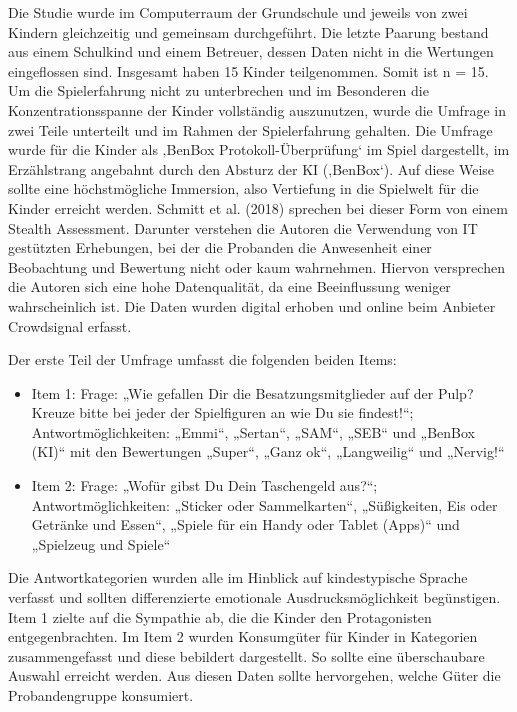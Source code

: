 \documentclass[
  a4paper,
  DIV=11,
  numbers=noendperiod,
  onecolumn,
  oneside,
  a4paper]{scrartcl}
\providecommand{\tightlist}{%
  \setlength{\itemsep}{0pt}\setlength{\parskip}{0pt}}
\begin{document}
Die Studie wurde im Computerraum der Grundschule und jeweils von zwei
Kindern gleichzeitig und gemeinsam durchgeführt. Die letzte Paarung
bestand aus einem Schulkind und einem Betreuer, dessen Daten nicht in
die Wertungen eingeflossen sind. Insgesamt haben 15 Kinder teilgenommen.
Somit ist n = 15. Um die Spielerfahrung nicht zu unterbrechen und im
Besonderen die Konzentrationsspanne der Kinder vollständig auszunutzen,
wurde die Umfrage in zwei Teile unterteilt und im Rahmen der
Spielerfahrung gehalten. Die Umfrage wurde für die Kinder als ‚BenBox
Protokoll-Überprüfung` im Spiel dargestellt, im Erzählstrang angebahnt
durch den Absturz der KI (‚BenBox`). Auf diese Weise sollte eine
höchstmögliche Immersion, also Vertiefung in die Spielwelt für die
Kinder erreicht werden. Schmitt et al. (2018) sprechen bei dieser Form
von einem Stealth Assessment. Darunter verstehen die Autoren die
Verwendung von IT gestützten Erhebungen, bei der die Probanden die
Anwesenheit einer Beobachtung und Bewertung nicht oder kaum wahrnehmen.
Hiervon versprechen die Autoren sich eine hohe Datenqualität, da eine
Beeinflussung weniger wahrscheinlich ist. Die Daten wurden digital
erhoben und online beim Anbieter Crowdsignal erfasst.

Der erste Teil der Umfrage umfasst die folgenden beiden Items:

\begin{itemize}
\tightlist
\item
  Item 1: Frage: „Wie gefallen Dir die Besatzungsmitglieder auf der
  Pulp? Kreuze bitte bei jeder der Spielfiguren an wie Du sie
  findest!{}``; Antwortmöglichkeiten: „Emmi``, „Sertan``, „SAM``, „SEB``
  und „BenBox (KI)`` mit den Bewertungen „Super``, „Ganz ok``,
  „Langweilig`` und „Nervig!{}``
\item
  Item 2: Frage: „Wofür gibst Du Dein Taschengeld aus?{}``;
  Antwortmöglichkeiten: „Sticker oder Sammelkarten``, „Süßigkeiten, Eis
  oder Getränke und Essen``, „Spiele für ein Handy oder Tablet (Apps)``
  und „Spielzeug und Spiele``
\end{itemize}

Die Antwortkategorien wurden alle im Hinblick auf kindestypische Sprache
verfasst und sollten differenzierte emotionale Ausdrucksmöglichkeit
begünstigen. Item 1 zielte auf die Sympathie ab, die die Kinder den
Protagonisten entgegenbrachten. Im Item 2 wurden Konsumgüter für Kinder
in Kategorien zusammengefasst und diese bebildert dargestellt. So sollte
eine überschaubare Auswahl erreicht werden. Aus diesen Daten sollte
hervorgehen, welche Güter die Probandengruppe konsumiert.
\end{document}
